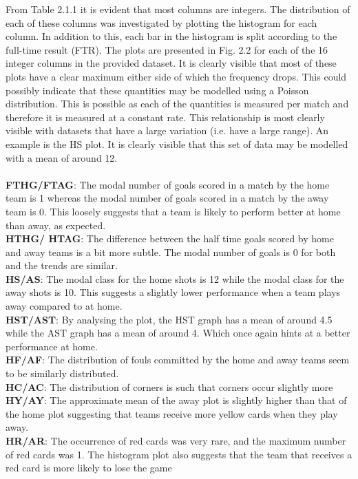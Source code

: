 \documentclass[a4paper,12pt]{article}
\begin{document}
	From Table 2.1.1 it is evident that most columns are integers. The distribution of each of these columns was investigated by plotting the histogram for each column. In addition to this, each bar in the histogram is split according to the full-time result (FTR). The plots are presented in Fig. 2.2 for each of the 16 integer columns in the provided dataset. It is clearly visible that most of these plots have a clear maximum either side of which the frequency drops. This could possibly indicate that these quantities may be modelled using a Poisson distribution. This is possible as each of the quantities is measured per match and therefore it is measured at a constant rate. This relationship is most clearly visible with datasets that have a large variation (i.e. have a large range). An example is the HS plot. It is clearly visible that this set of data may be modelled with a mean of around 12.\\
	\\
	\textbf{FTHG/FTAG}: The modal number of goals scored in a match by the home team is 1 whereas the modal number of goals scored in a match by the away team is 0. This loosely suggests that a team is likely to perform better at home than away, as expected.\\
	\textbf{HTHG/ HTAG}: The difference between the half time goals scored by home and away teams is a bit more subtle. The modal number of goals is 0 for both and the trends are similar.\\
	\textbf{HS/AS}: The modal class for the home shots is 12 while the modal class for the away shots is 10. This suggests a slightly lower performance when a team plays away compared to at home.\\
	\textbf{HST/AST}: By analysing the plot, the HST graph has a mean of around 4.5 while the AST graph has a mean of around 4. Which once again hints at a better performance at home.\\
	\textbf{HF/AF}: The distribution of fouls committed by the home and away teams seem to be similarly distributed.\\
	\textbf{HC/AC}: The distribution of corners is such that corners occur slightly more \\
	\textbf{HY/AY}: The approximate mean of the away plot is slightly higher than that of the home plot suggesting that teams receive more yellow cards when they play away.\\
	\textbf{HR/AR}: The occurrence of red cards was very rare, and the maximum number of red cards was 1. The histogram plot also suggests that the team that receives a red card is more likely to lose the game
	
\end{document}
